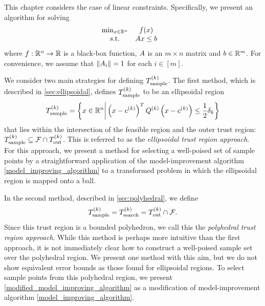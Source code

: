 This chapter considers the case of linear constraints.
Specifically, we present an algorithm for solving
\begin{align}
\label{eq:DFO-linear}
\begin{array}{ccl} \min_{x \in \mathbb R^n} & f(x) \\
\textrm{s.t.} & {A} x \le {b} & 
\end{array}
\end{align}
where $f:\mathbb R^n\rightarrow\mathbb R$ is a black-box function, 
${A}$ is an $m \times n$ matrix and ${b} \in \mathbb R^m$.
For convenience, we assume that $\left\|{A}_i\right\| = 1$ for each $i \in [m]$.

We consider two main strategies for defining ${T_{\text{sample}}^{(k)}}$.
The first method,  which is described in \cref{sec:ellipsoidal},  
defines ${T_{\text{sample}}^{(k)}}$ to be an ellipsoidal region
\begin{align}
\label{define_the_sample_region}
{T_{\text{sample}}^{(k)}} = \left\{x \in \mathbb R^n \bigg | \left(x - c^{(k)}\right)^T {Q^{(k)}} \left(x - c^{(k)}\right) \le \frac 1 2 \delta_k \right\}
\end{align}
that lies within the intersection of the feasible region and the outer trust region:
${T_{\text{sample}}^{(k)}} \subseteq {\mathcal F} \cap {T_{\text{out}}^{(k)}}$.
This is referred to as the {\em ellipsoidal trust region approach}.
For this approach, we present a method for selecting a well-poised set of sample points by a straightforward application 
of the model-improvement algorithm \cref{model_improving_algorithm} to a transformed problem in which 
the ellipsoidal region is mapped onto a ball.




In the second method,  described in \cref{sec:polyhedral}, we define 
\begin{align*}
{T_{\text{sample}}^{(k)}} = {T_{\text{search}}^{(k)}} = {T_{\text{out}}^{(k)}} \cap {\mathcal F}.
\end{align*}
Since this trust region is a bounded polyhedron,  we call this the {\em polyhedral trust region approach}.
While this method is perhaps more intuitive than the first approach,
it is not immediately clear how to construct a well-poised sample set over the polyhedral region.
We present one method with this aim, but we do not show equivalent error bounds as those found for ellipsoidal regions.
To select sample points from this polyhedral region, 
we present \cref{modified_model_improving_algorithm} as a modification of model-improvement algorithm \cref{model_improving_algorithm}.

